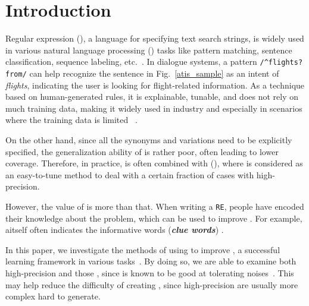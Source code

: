\section{Introduction}


Regular expression (\RE), a language for specifying text search strings, is widely used in various natural language processing (\NLP) tasks like pattern matching, sentence classification, sequence labeling, etc.~\cite{chang2014tokensregex}. 
In dialogue systems, a \RE pattern \texttt{/\textasciicircum flights? from/} can help
recognize the sentence in Fig.~\ref{atis_sample} as an intent of \emph{flights}, indicating the user is looking for
flight-related information. As a technique based on human-generated rules, it is explainable, tunable, and does not rely on much training data,
making it widely used in industry and especially in scenarios where the training data is limited ~\cite{gc2015big}.

On the other hand, since all the synonyms and variations need to be explicitly specified, the generalization ability of \RE is rather poor,
often leading to lower coverage. Therefore, in practice, \RE is often combined with 
(\NN), where \RE is considered as an easy-to-tune method to deal with a certain fraction of cases with high-precision.

However, the value of \RE is more than that. When writing a \texttt{RE}, people have encoded their knowledge about the problem, which can 
be used to improve . For example, a\RE itself often indicates the informative words
(\textbf{\textit{clue words}}) . %

In this paper,
we investigate the methods of using \RE to improve \NN, a successful learning framework in various \NLP tasks~\cite{goldberg2017neural}. 
By doing so,  %
we are able to examine both high-precision \REs and those , %
since \NN is known to be good at
tolerating noises~\cite{xie2016disturblabel}. This may help reduce the difficulty of creating \REs, since high-precision \REs
are usually more complex %
hard to generate.

